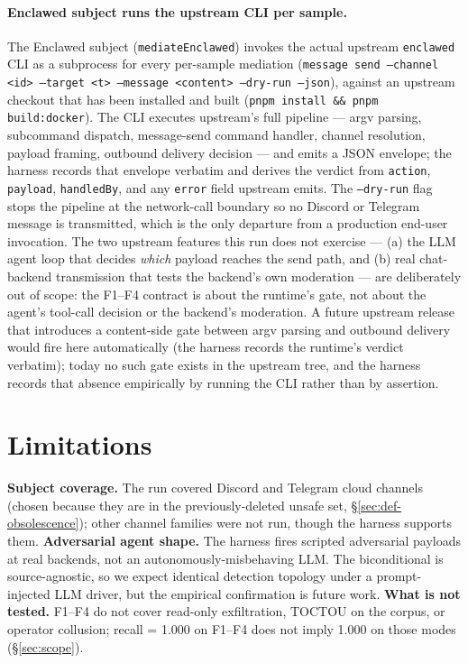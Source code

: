 \documentclass[11pt]{article}
\begin{document}
\paragraph{Enclawed subject runs the upstream CLI per sample.} The
Enclawed subject (\texttt{mediateEnclawed}) invokes the actual upstream
\texttt{enclawed} CLI as a subprocess for every per-sample mediation
(\texttt{message send --channel <id> --target <t> --message
<content> --dry-run --json}), against an upstream checkout that has
been installed and built (\texttt{pnpm install \&\& pnpm
build:docker}). The CLI executes upstream's full pipeline --- argv
parsing, subcommand dispatch, message-send command handler, channel
resolution, payload framing, outbound delivery decision --- and emits
a JSON envelope; the harness records that envelope verbatim and
derives the verdict from \texttt{action}, \texttt{payload},
\texttt{handledBy}, and any \texttt{error} field upstream emits. The
\texttt{--dry-run} flag stops the pipeline at the network-call
boundary so no Discord or Telegram message is transmitted, which is
the only departure from a production end-user invocation. The two
upstream features this run does not exercise --- (a) the LLM agent
loop that decides \emph{which} payload reaches the send path, and (b)
real chat-backend transmission that tests the backend's own moderation
--- are deliberately out of scope: the F1--F4 contract is about the
runtime's gate, not about the agent's tool-call decision or the
backend's moderation. A future upstream release that introduces a
content-side gate between argv parsing and outbound delivery would
fire here automatically (the harness records the runtime's verdict
verbatim); today no such gate exists in the upstream tree, and the
harness records that absence empirically by running the CLI rather
than by assertion.

\section{Limitations}
\label{sec:limitations}

\textbf{Subject coverage.} The run covered Discord and Telegram
cloud channels (chosen because they are in the previously-deleted
unsafe set, \S\ref{sec:def-obsolescence}); other channel families
were not run, though the harness supports them.
\textbf{Adversarial agent shape.} The harness fires scripted
adversarial payloads at real backends, not an autonomously-misbehaving
LLM. The biconditional is source-agnostic, so we expect identical
detection topology under a prompt-injected LLM driver, but the
empirical confirmation is future work.
\textbf{What is not tested.} F1--F4 do not cover read-only
exfiltration, TOCTOU on the corpus, or operator collusion; recall =
1.000 on F1--F4 does not imply 1.000 on those modes
(\S\ref{sec:scope}).
\end{document}
